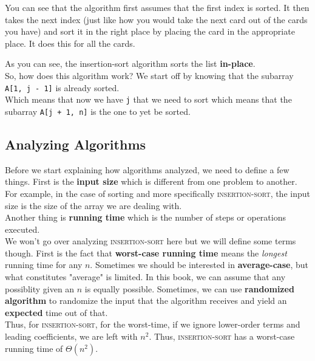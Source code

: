 \documentclass[12pt]{article}
\begin{document}
You can see that the algorithm first assumes that the first index is sorted. It then takes the next index (just like how you would take the next card out of the cards you have) and sort it in the right place by placing the card in the appropriate place. It does this for all the cards.


As you can see, the insertion-sort algorithm sorts the list \textbf{in-place}. \\

So, how does this algorithm work? We start off by knowing that the subarray \texttt{A[1, j - 1]} is already sorted.\\

Which means that now we have \texttt{j} that we need to sort which means that the subarray \mbox{\texttt{A[j + 1, n]}} is the one to yet be sorted.

\subsection{Analyzing Algorithms}

Before we start explaining how algorithms analyzed, we need to define a few things. First is the \textbf{input size} which is different from one problem to another. For example, in the case of sorting and more specifically \textsc{insertion-sort}, the input size is the size of the array we are dealing with. \\

Another thing is \textbf{running time} which is the number of steps or operations executed. \\

We won't go over analyzing \textsc{insertion-sort} here but we will define some terms though. First is the fact that \textbf{worst-case running time} means the \textit{longest} running time for any $n$. Sometimes we should be interested in \textbf{average-case}, but what constitutes "average" is limited. In this book, we can assume that any possiblity given an $n$ is equally possible. Sometimes, we can use \textbf{randomized algorithm} to randomize the input that the algorithm receives and yield an \textbf{expected} time out of that.\\

Thus, for \textsc{insertion-sort}, for the worst-time, if we ignore lower-order terms and leading coefficients, we are left with $n^2$. Thus, \textsc{insertion-sort} has a worst-case running time of $\Theta (n^2)$.\\
\end{document}

